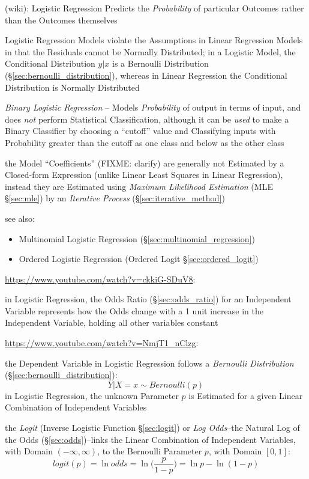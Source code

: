 (wiki): Logistic Regression Predicts the \emph{Probability} of particular
Outcomes rather than the Outcomes themselves

Logistic Regression Models violate the Assumptions in Linear Regression Models
in that the Residuals cannot be Normally Distributed; in a Logistic Model, the
Conditional Distribution $y | x$ is a Bernoulli Distribution
(\S\ref{sec:bernoulli_distribution}), whereas in Linear Regression the
Conditional Distribution is Normally Distributed

\emph{Binary Logistic Regression} -- Models \emph{Probability} of output in
terms of input, and does \emph{not} perform Statistical Classification, although
it can be \emph{used} to make a Binary Classifier by choosing a ``cutoff'' value
and Classifying inputs with Probability greater than the cutoff as one class and
below as the other class

the Model ``Coefficients'' (FIXME: clarify) are generally not Estimated by a
Closed-form Expression (unlike Linear Least Squares in Linear Regression),
instead they are Estimated using \emph{Maximum Likelihood Estimation} (MLE
\S\ref{sec:mle}) by an \emph{Iterative Process} (\S\ref{sec:iterative_method})

see also:
\begin{itemize}
  \item Multinomial Logistic Regression (\S\ref{sec:multinomial_regression})
  \item Ordered Logistic Regression (Ordered Logit \S\ref{sec:ordered_logit})
\end{itemize}

\asterism

\url{https://www.youtube.com/watch?v=ckkiG-SDuV8}:

in Logistic Regression, the Odds Ratio (\S\ref{sec:odds_ratio}) for an
Independent Variable represents how the Odds change with a 1 unit increase in
the Independent Variable, holding all other variables constant

\url{https://www.youtube.com/watch?v=NmjT1_nClzg}:

the Dependent Variable in Logistic Regression follows a \emph{Bernoulli
  Distribution} (\S\ref{sec:bernoulli_distribution}):
\[
  Y | X = x \sim Bernoulli(p)
\]
in Logistic Regression, the unknown Parameter $p$ is Estimated for a given
Linear Combination of Independent Variables

the \emph{Logit} (Inverse Logistic Function \S\ref{sec:logit}) or \emph{Log
  Odds}--the Natural Log of the Odds (\S\ref{sec:odds})--links the Linear
Combination of Independent Variables, with Domain $(-\infty, \infty)$, to the
Bernoulli Parameter $p$, with Domain $[0, 1]$:
\[
  logit(p) = \ln odds = \ln \Big(\frac{p}{1 - p}\Big) = \ln p - \ln (1 - p)
\]

